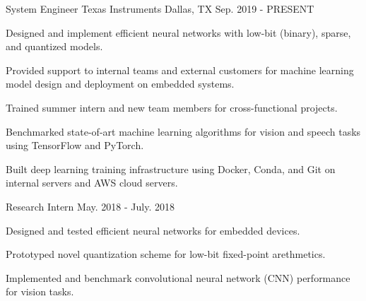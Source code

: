 

\begin{cventries}

\cventry
{System Engineer} %
{Texas Instruments} %
{Dallas, TX} %
{Sep. 2019 - PRESENT} %
{
		\begin{cvitems} %
			\item {Designed and implement efficient neural networks with low-bit (binary), sparse, and quantized models.}
			\item {Provided support to internal teams and external customers for machine learning model design and deployment on embedded systems.}
			\item {Trained summer intern and new team members for cross-functional projects.}
			\item {Benchmarked state-of-art machine learning algorithms for vision and speech tasks using TensorFlow and PyTorch.}
			\item {Built deep learning training infrastructure using Docker, Conda, and Git on internal servers and AWS cloud servers.}
		\end{cvitems}
}

\cventry
{Research Intern} %
{} %
{} %
{May. 2018 - July. 2018} %
{
		\begin{cvitems} %
				\item {Designed and tested efficient neural networks for embedded devices.}
				\item {Prototyped novel quantization scheme for low-bit fixed-point arethmetics.}
				\item {Implemented and benchmark convolutional neural network (CNN) performance for vision tasks.}
		\end{cvitems}
}


\end{cventries}
